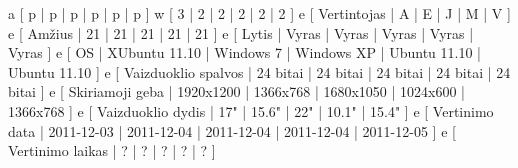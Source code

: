 \xtableu
{
  a [ p | p | p | p | p | p ]
  w [ 3 | 2 | 2 | 2 | 2 | 2 ]
  e [ Vertintojas         | A | E | J | M | V ]
  e [ Amžius              | 21 | 21 | 21 | 21 | 21 ]
  e [ Lytis               | Vyras | Vyras | Vyras | Vyras | Vyras ]
  e [ OS                  | XUbuntu 11.10 | Windows 7 | Windows XP | Ubuntu 11.10 | Ubuntu 11.10 ]
  e [ Vaizduoklio spalvos | 24 bitai | 24 bitai | 24 bitai | 24 bitai | 24 bitai ]
  e [ Skiriamoji geba     | 1920x1200 | 1366x768 | 1680x1050 | 1024x600 | 1366x768 ]
  e [ Vaizduoklio dydis   | 17" | 15.6" | 22" | 10.1" | 15.4" ]
  e [ Vertinimo data      | 2011-12-03 | 2011-12-04 | 2011-12-04 | 2011-12-04  | 2011-12-05 ]
  e [ Vertinimo laikas    | ? | ? | ? | ? | ? ]
}
